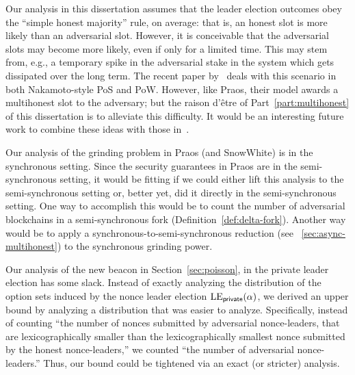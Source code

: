 Our analysis in this dissertation assumes that the leader election outcomes obey 
the ``simple honest majority'' rule, on average: 
that is, an honest slot is more likely than an adversarial slot. 
However, it is conceivable that the adversarial slots may become more likely, even if only for a limited time. 
This may stem from, e.g., a temporary spike in the adversarial stake in the system 
which gets dissipated over the long term. 
The recent paper by~\citet{AdversarialSupremacy} deals with this scenario in both Nakamoto-style PoS and PoW. 
However, like Praos, their model awards a multihonest slot to the adversary; 
but the raison d'\^{e}tre of Part~\ref{part:multihonest} of this dissertation 
is to alleviate this difficulty.
It would be an interesting future work to combine these ideas with those in~\cite{AdversarialSupremacy}.

Our analysis of the grinding problem in Praos (and SnowWhite) 
is in the synchronous setting. 
Since the security guarantees in Praos are in the semi-synchronous setting, 
it would be fitting if we could either lift this analysis to the semi-synchronous setting 
or, better yet, did it directly in the semi-synchronous setting. 
One way to accomplish this would be to 
count the number of adversarial blockchains in a semi-synchronous fork (Definition~\ref{def:delta-fork}). 
Another way would be to apply a synchronous-to-semi-synchronous reduction (see \Section~\ref{sec:async-multihonest})
to the synchronous grinding power.


Our analysis of the new beacon in Section~\ref{sec:poisson}, 
in the private leader election 
has some slack. 
Instead of exactly analyzing 
the distribution of the option sets 
induced by the nonce leader election $\mathrm{LE}_\mathsf{private}(\alpha)$, 
we derived an upper bound by analyzing a distribution 
that was easier to analyze. 
Specifically, 
instead of counting ``the number of nonces submitted by adversarial nonce-leaders, 
that are lexicographically smaller than 
the lexicographically smallest nonce submitted by the honest nonce-leaders,'' 
we counted ``the number of adversarial nonce-leaders.'' 
Thus, our bound could be tightened via an exact (or stricter) analysis.
















\pagebreak












